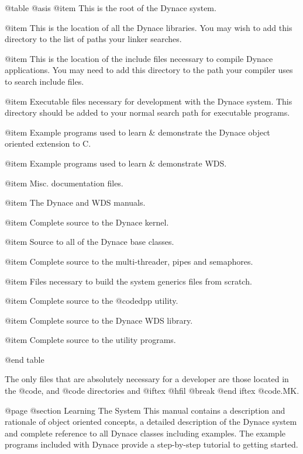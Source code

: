 @table @asis
@item \DYNACE
This is the root of the Dynace system.

@item \DYNACE\LIB
This is the location of all the Dynace libraries.  You may wish to add
this directory to the list of paths your linker searches.

@item \DYNACE\INCLUDE
This is the location of the include files necessary to compile Dynace
applications.  You may need to add this directory to the path your
compiler uses to search include files.

@item \DYNACE\BIN
Executable files necessary for development with the Dynace system.
This directory should be added to your normal search path for executable
programs.

@item \DYNACE\EXAMPLES
Example programs used to learn & demonstrate the Dynace object oriented
extension to C.

@item \DYNACE\WINEXAM
Example programs used to learn & demonstrate WDS.

@item \DYNACE\DOCS
Misc. documentation files.

@item \DYNACE\MANUAL
The Dynace and WDS manuals.

@item \DYNACE\KERNAL
Complete source to the Dynace kernel.

@item \DYNACE\CLASS
Source to all of the Dynace base classes.

@item \DYNACE\THREADS
Complete source to the multi-threader, pipes and semaphores.

@item \DYNACE\GENERICS
Files necessary to build the system generics files from scratch.

@item \DYNACE\DPP
Complete source to the @code{dpp} utility.

@item \DYNACE\WINDOWS
Complete source to the Dynace WDS library.

@item \DYNACE\UTILS
Complete source to the utility programs.

@end table



The only files that are absolutely necessary for a developer are those
located in the @code{\DYNACE\LIB, \DYNACE\INCLUDE} and @code{\DYNACE\BIN}
directories and
@iftex 
@hfil 
@break 
@end iftex 
@code{\DYNACE\UTILS\STARTUP.MK}.




@page
@section Learning The System
This manual contains a description and rationale of object oriented
concepts, a detailed description of the Dynace system and complete
reference to all Dynace classes including examples.  The example programs
included with Dynace provide a step-by-step tutorial to getting started.

